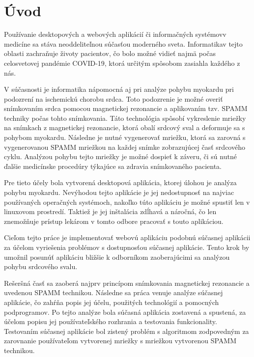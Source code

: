 \chapter {Úvod}
Používanie desktopových a webových aplikácií či informačných systémov\newline v medicíne sa stáva neoddeliteľnou súčasťou moderného sveta. Informatika\newline v tejto oblasti zachraňuje životy pacientov, čo bolo možné vidieť najmä počas celosvetovej pandémie COVID-19, ktorá určitým spôsobom zasiahla každého z nás.

V súčasnosti je informatika nápomocná aj pri analýze pohybu myokardu pri podozrení na ischemickú chorobu srdca. Toto podozrenie je možné overiť snímkovaním srdca pomocou magnetickej rezonancie a aplikovaním tzv. SPAMM techniky počas tohto snímkovania. Táto technológia spôsobí vykreslenie mriežky na snímkach z magnetickej rezonancie, ktorá obalí srdcový sval a deformuje sa s pohybom myokardu. Následne je nutné vygenerovať mriežku, ktorá sa zarovná s vygenerovanou SPAMM mriežkou na každej snímke zobrazujúcej časť srdcového cyklu. Analýzou pohybu tejto mriežky je možné dospieť k záveru, či sú nutné ďalšie medicínske procedúry týkajúce sa zdravia snímkovaného pacienta.

Pre tieto účely bola vytvorená desktopová aplikácia, ktorej úlohou je analýza pohybu myokardu. Nevýhodou tejto aplikácie je jej nedostupnosť na najviac používaných operačných systémoch, nakoľko túto aplikáciu je možné spustiť len v linuxovom prostredí. Taktiež je jej inštalácia zdĺhavá a náročná, čo len znemožňuje prístup lekárom v tomto odbore pracovať s touto aplikáciou.

Cieľom tejto práce je implementovať webovú aplikáciu podobnú súčasnej aplikácii za účelom vyriešenia problémov s dostupnosťou súčasnej aplikácie. Tento krok by umožnil posunúť aplikáciu bližšie k odborníkom zaoberajúcimi sa analýzou pohybu srdcového svalu.

Rešeršná časť sa zaoberá najprv princípom snímkovania magnetickej rezonancie a uvedenou SPAMM technikou. Následne sa práca venuje analýze súčasnej aplikácie, čo zahŕňa popis jej účelu, použitých technológií a pomocných podprogramov. Po tejto analýze bola súčasná aplikácia zostavená a spustená, za účelom popisu jej používateľského rozhrania a testovania funkcionality. Testovaním súčasnej aplikácie bol zistený problém s algoritmom zodpovedným za zarovnanie používateľom vytvorenej mriežky s mriežkou vytvorenou SPAMM technikou.

